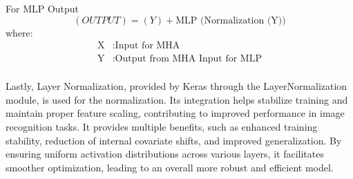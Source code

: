 For MLP Output
\[(OUTPUT) = (Y)+\text{MLP (Normalization (Y))}\]
where:
\begin{align*}
    \text{X} & : \text{Input for MHA}                 \\
    \text{Y} & : \text{Output from MHA Input for MLP} \\
\end{align*}

Lastly, Layer Normalization, provided by Keras through the LayerNormalization module, is used for the normalization. Its integration helps stabilize training and maintain proper feature scaling, contributing to improved performance in image recognition tasks. It provides multiple benefits, such as enhanced training stability, reduction of internal covariate shifts, and improved generalization. By ensuring uniform activation distributions across various layers, it facilitates smoother optimization, leading to an overall more robust and efficient model.

\newpage